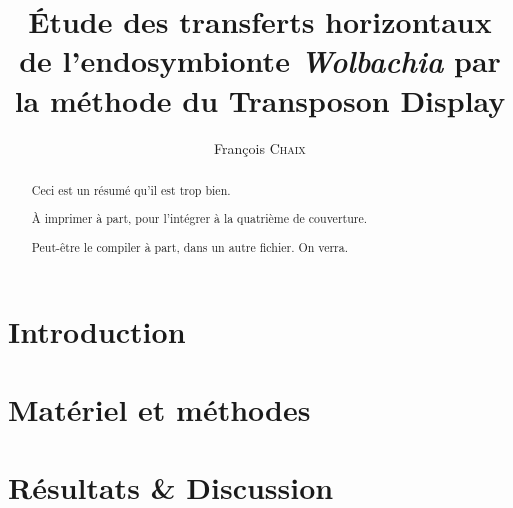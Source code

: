 \documentclass[a4paper, 12pt, linktocpage=true, oneside]{memoir}
\title{Étude des transferts horizontaux de l’endosymbionte \textit{Wolbachia} par la méthode du Transposon Display}
\author{François \textsc{Chaix}}
\renewcommand{\baselinestretch}{1.5}
\begin{document}
\maketitle
\tableofcontents

\chapter{Introduction}


\chapter{Matériel et méthodes}


\chapter{Résultats \& Discussion}


\printbibliography
\listoffigures

\newpage
\pagestyle{empty}
\renewcommand{\baselinestretch}{1} %
\begin{abstract}
Ceci est un résumé qu'il est trop bien.

À imprimer à part, pour l'intégrer à la quatrième de couverture.

Peut-être le compiler à part, dans un autre fichier. On verra.
\end{abstract}
\end{document}
